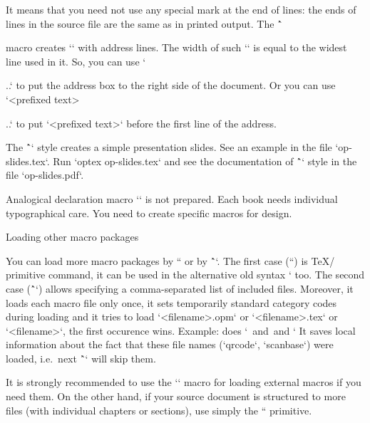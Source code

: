 {It means that you need not use any special mark at the end of lines: the ends
of lines in the source file are the same as in printed output. The
\^`\address` macro creates `\vtop` with address lines. The width of such
`\vtop` is equal to the widest line used in it. So, you can use
`\hfill\address...` to put the address box to the right side of the
document. Or you can use `<prefixed text>\address...` to put
`<prefixed text>` before the first line of the address.

The \^`\slides` style creates a simple presentation slides. See an example
in the file `op-slides.tex`. Run `optex op-slides.tex` and see the documentation of
\^`\slides` style in the file `op-slides.pdf`.

Analogical declaration macro `\book` is not prepared. Each book needs
individual typographical care. You need to create specific macros for
design.

\secc Loading other macro packages

You can load more macro packages by `` or by
\^``. The first case (``) is \TeX/ primitive command, it can be
used in the alternative old syntax ` too. The
second case (\^`\load`) allows specifying a comma-separated list of included files.
Moreover, it loads each macro file only once, it sets
temporarily standard category codes during loading and it tries to
load `<filename>.opm` or `<filename>.tex` or `<filename>`, the first occurence
wins. Example:
\begtt
{}
\endtt
%
does ` \,and \,and `
It saves local information about the fact that these file names
(`qrcode`, `scanbase`) were loaded, i.e.\ next \^`\load` will skip them.

It is strongly recommended to use the `\load` macro for loading external
macros if you need them. On the other hand, if your source document is structured
to more files (with individual chapters or sections), use simply the `` primitive.

}
